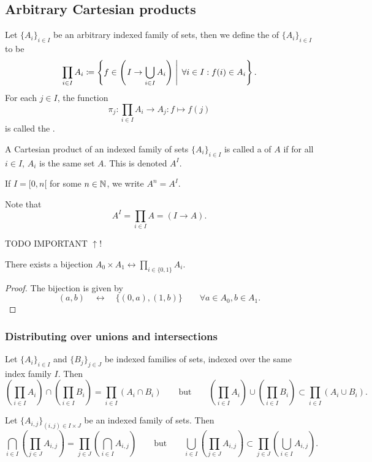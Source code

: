 \subsection{Arbitrary Cartesian products}
\begin{definition}
Let $\{A_i\}_{i\in I}$ be an arbitrary indexed family of sets, then we define the  of $\{A_i\}_{i\in I}$ to be
\[ \prod_{i\in I}A_i \coloneqq \left\{ f\in \left(\left. I \to \bigcup_{i\in I}A_i \right) \; \right| \; \forall i\in I: f(i) \in A_i \right\}. \]
For each $j\in I$, the function
\[ \pi_j : \prod_{i\in I}A_i \to A_j: f\mapsto f(j) \]
is called the .
\end{definition}

\begin{definition}
A Cartesian product of an indexed family of sets $\{A_i\}_{i\in I}$ is called a  of $A$ if for all $i\in I$, $A_i$ is the same set $A$. This is denoted $A^I$.
\end{definition}
If $I = [0,n[$ for some $n\in \mathbb{N}$, we write $A^n = A^I$.

Note that
\[ A^I = \prod_{i\in I} A = (I\to A).  \]

TODO IMPORTANT $\uparrow$!

\begin{lemma}
There exists a bijection $A_0\times A_1 \leftrightarrow \prod_{i\in\{0,1\}} A_i$.
\end{lemma}
\begin{proof}
The bijection is given by
\[ (a,b) \quad\leftrightarrow\quad \{(0,a),(1,b)\} \qquad \forall a\in A_0, b\in A_1. \]
\end{proof}

\subsubsection{Distributing over unions and intersections}
\begin{lemma}
Let $\{A_{i}\}_{i \in I}$ and $\{B_{j}\}_{j \in J}$ be indexed families of sets, indexed over the same index family $I$. Then
\[ \left(\prod_{i\in I}A_i\right)\cap\left(\prod_{i\in I}B_i\right) = \prod_{i\in I}(A_i\cap B_i) \qquad\text{but}\qquad \left(\prod_{i\in I}A_i\right)\cup\left(\prod_{i\in I}B_i\right) \subset \prod_{i\in I}(A_i\cup B_i). \]
\end{lemma}

\begin{lemma}
Let $\{A_{i,j}\}_{(i,j) \in I\times J}$ be an indexed family of sets. Then
\[ \bigcap_{i\in I}\left(\prod_{j\in J}A_{i,j}\right) = \prod_{j\in J}\left(\bigcap_{i\in I}A_{i,j}\right) \qquad\text{but}\qquad \bigcup_{i\in I}\left(\prod_{j\in J}A_{i,j}\right) \subset \prod_{j\in J}\left(\bigcup_{i\in I}A_{i,j}\right). \]
\end{lemma}

